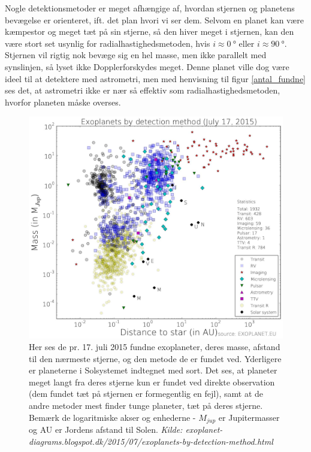 Nogle detektionsmetoder er meget afhængige af, hvordan stjernen og planetens bevægelse er orienteret, ift. det plan hvori vi ser dem. Selvom en planet kan være kæmpestor og meget tæt på sin stjerne, så den hiver meget i stjernen, kan den være stort set usynlig for radialhastighedsmetoden, hvis $i\approx\SI{0}{\degree}$ eller $i\approx\SI{90}{\degree}$. Stjernen vil rigtig nok bevæge sig en hel masse, men ikke parallelt med synslinjen, så lyset ikke Dopplerforskydes meget. Denne planet ville dog være ideel til at detektere med astrometri, men med henvisning til figur \ref{antal_fundne} ses det, at astrometri ikke er nær så effektiv som radialhastighedsmetoden, hvorfor planeten måske overses. \\

\begin{figure}[h!]
    \centering
    \includegraphics[width=.8\textwidth]{Astrofysik/billeder/sammenligning.PNG}
    \caption{Her ses de pr. 17. juli 2015 fundne exoplaneter, deres masse, afstand til den nærmeste stjerne, og den metode de er fundet ved. Yderligere er planeterne i Solsystemet indtegnet med sort. Det ses, at planeter meget langt fra deres stjerne kun er fundet ved direkte observation (dem fundet tæt på stjernen er formegentlig en fejl), samt at de andre metoder mest finder tunge planeter, tæt på deres stjerne. Bemærk de logaritmiske akser og enhederne - $M_{jup}$ er Jupitermasser og AU er Jordens afstand til Solen. \emph{Kilde: exoplanet-diagrams.blogspot.dk/2015/07/exoplanets-by-detection-method.html}}
    \label{fig:sammenligning}
\end{figure}

